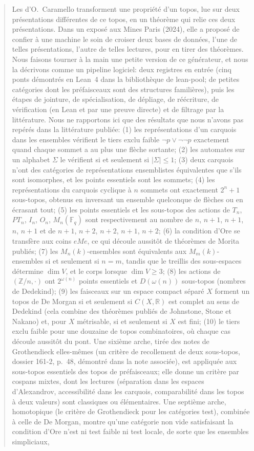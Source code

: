 \begin{abstract}
Les  d'O.~Caramello transforment une propriété d'un topos, lue sur deux présentations différentes de ce topos, en un théorème qui relie ces deux présentations. Dans un exposé aux Mines Paris (2024), elle a proposé de confier à une machine le soin de croiser deux bases de données, l'une de telles présentations, l'autre de telles lectures, pour en tirer des théorèmes. Nous faisons tourner à la main une petite version de ce générateur, et nous la décrivons comme un pipeline logiciel: deux registres en entrée (cinq ponts démontrés en Lean~4 dans la bibliothèque \lp{} de lean-pool; de petites catégories dont les préfaisceaux sont des structures familières), puis les étapes de jointure, de spécialisation, de dépliage, de réécriture, de vérification (en Lean et par une preuve directe) et de filtrage par la littérature. Nous ne rapportons ici que des résultats que nous n'avons pas repérés dans la littérature publiée: (1) les représentations d'un carquois dans les ensembles vérifient le tiers exclu faible $\neg p\vee\neg\neg p$ exactement quand chaque sommet a au plus une flèche sortante; (2) les automates sur un alphabet $\Sigma$ le vérifient si et seulement si $|\Sigma|\le 1$; (3) deux carquois n'ont des catégories de représentations ensemblistes équivalentes que s'ils sont isomorphes, et les points essentiels sont les sommets; (4) les représentations du carquois cyclique à $n$ sommets ont exactement $2^n+1$ sous-topos, obtenus en inversant un ensemble quelconque de flèches ou en écrasant tout; (5) les points essentiels et les sous-topos des actions de $T_n$, $PT_n$, $I_n$, $O_n$, $M_n(\mathbb F_q)$ sont respectivement au nombre de $n$, $n+1$, $n+1$, $n$, $n+1$ et de $n+1$, $n+2$, $n+2$, $n+1$, $n+2$; (6) la condition d'Ore se transfère aux coins $eMe$, ce qui découle aussitôt de théorèmes de Morita publiés; (7) les $M_n(k)$-ensembles sont équivalents aux $M_m(k)$-ensembles si et seulement si $n=m$, tandis que le treillis des sous-espaces détermine $\dim V$, et le corps lorsque $\dim V\ge 3$; (8) les actions de $(\mathbb Z/n,\cdot)$ ont $2^{\omega(n)}$ points essentiels et $D(\omega(n))$ sous-topos (nombres de Dedekind); (9) les faisceaux sur un espace compact séparé $X$ forment un topos de De Morgan si et seulement si $C(X,\mathbb R)$ est complet au sens de Dedekind (cela combine des théorèmes publiés de Johnstone, Stone et Nakano) et, pour $X$ métrisable, si et seulement si $X$ est fini; (10) le tiers exclu faible pour une douzaine de topos combinatoires, où chaque cas découle aussitôt du pont. Une sixième arche, tirée des notes de Grothendieck elles-mêmes (un critère de recollement de deux sous-topos, dossier 161-2, p.~48, démontré dans la note associée), est appliquée aux sous-topos essentiels des topos de préfaisceaux; elle donne un critère par cospans mixtes, dont les lectures (séparation dans les espaces d'Alexandrov, accessibilité dans les carquois, comparabilité dans les topos à deux valeurs) sont classiques ou élémentaires. Une septième arche, homotopique (le critère de Grothendieck pour les catégories test), combinée à celle de De Morgan, montre qu'une catégorie non vide satisfaisant la condition d'Ore n'est ni test faible ni test locale, de sorte que les ensembles simpliciaux, 
\end{abstract}

